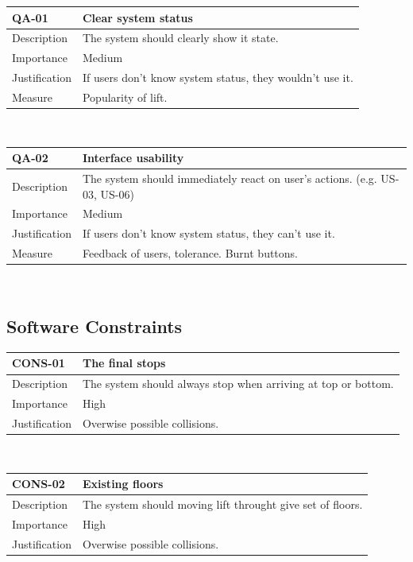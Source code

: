 \documentclass[a4paper,11pt]{article}
\begin{document}
\noindent\begin{tabularx}{\textwidth}{|C{2cm}|Y|}
  \hline
  \textbf{QA-01} & \textbf{Clear system status}\\
  \hline
  Description &
  The system should clearly show it state.
  \\
  \hline
  Importance & Medium\\
  \hline
  Justification &
  If users don't know system status, they wouldn't use it.
  \\
  \hline
  Measure & Popularity of lift.\\
  \hline
\end{tabularx}\\[15pt]

\noindent\begin{tabularx}{\textwidth}{|C{2cm}|Y|}
  \hline
  \textbf{QA-02} & \textbf{Interface usability}\\
  \hline
  Description &
  The system should immediately react on user's actions. (e.g. US-03, US-06)
  \\
  \hline
  Importance & Medium\\
  \hline
  Justification &
  If users don't know system status, they can't use it.
  \\
  \hline
  Measure & Feedback of users, tolerance. Burnt buttons.\\
  \hline
\end{tabularx}\\[15pt]

\subsection{Software Constraints}
\label{sub:Software Constraints}

\noindent\begin{tabularx}{\textwidth}{|C{2cm}|Y|}
  \hline
  \textbf{CONS-01} & \textbf{The final stops}\\
  \hline
  Description &
  The system should always stop when arriving at top or bottom.
  \\
  \hline
  Importance & High\\
  \hline
  Justification &
  Overwise possible collisions.
  \\
  \hline
\end{tabularx}\\[15pt]

\noindent\begin{tabularx}{\textwidth}{|C{2cm}|Y|}
  \hline
  \textbf{CONS-02} & \textbf{Existing floors}\\
  \hline
  Description &
  The system should moving lift throught give set of floors.
  \\
  \hline
  Importance & High\\
  \hline
  Justification &
  Overwise possible collisions.
  \\
  \hline
\end{tabularx}\\[15pt]
\end{document}

